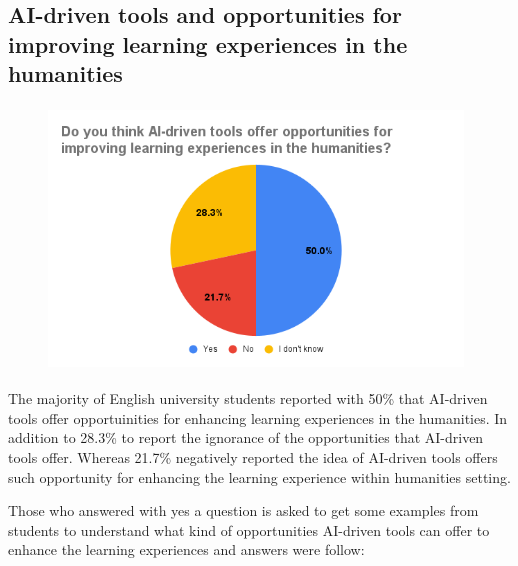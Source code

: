\subsection{AI-driven tools and opportunities for improving learning experiences in the humanities }
\begin{figure}[H]
	\centering
	\includegraphics[width=11cm, height=7cm]{./chap4/figures/op.png}
\end{figure}

The majority of English university students reported with 50\% that AI-driven tools offer opportuinities
for enhancing learning experiences in the humanities. In addition to 28.3\% to report the
ignorance of the opportunities that AI-driven tools offer. Whereas 21.7\% negatively reported
the idea of AI-driven tools offers such opportunity for enhancing the learning experience
within humanities setting.


Those who answered with yes a question is asked to get some examples from students
to understand what kind of opportunities AI-driven tools can offer to enhance the learning experiences and answers were follow:


